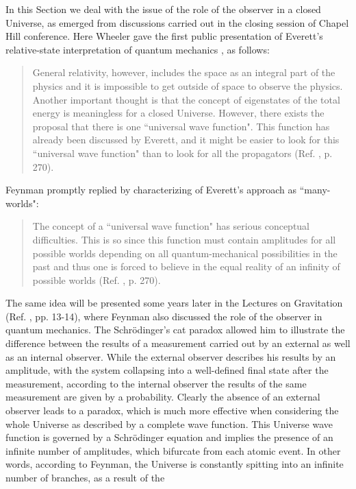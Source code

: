 \documentclass{ws-procs961x669}            %
\begin{document}
In this Section we deal with the issue of the role of the observer
in a closed Universe, as emerged from discussions carried out in
the closing session of Chapel Hill conference. Here Wheeler gave
the first public presentation of Everett's relative-state
interpretation of quantum mechanics \cite{Everett,Osnaghi}, as
follows:
%
\begin{quote}
General relativity, however, includes the space as an integral
part of the physics and it is impossible to get outside of space
to observe the physics. Another important thought is that the
concept of eigenstates of the total energy is meaningless for a
closed Universe. However, there exists the proposal that there is
one ``universal wave function". This function has already been
discussed by Everett, and it might be easier to look for this
``universal wave function" than to look for all the propagators
(Ref. , p. 270).
\end{quote}
%
Feynman promptly replied by characterizing of Everett's approach
as ``many-worlds":
%
\begin{quote}
The concept of a ``universal wave function" has serious conceptual
difficulties. This is so since this function must contain
amplitudes for all possible worlds depending on all
quantum-mechanical possibilities in the past and thus one is
forced to believe in the equal reality of an infinity of possible
worlds (Ref. , p. 270).
\end{quote}
%
The same idea will be presented some years later in the Lectures
on Gravitation (Ref. , pp. 13-14), where
Feynman also discussed the role of the observer in quantum
mechanics. The Schr\"{o}dinger's cat paradox allowed him to
illustrate the difference between the results of a measurement
carried out by an external as well as an internal observer. While
the external observer describes his results by an amplitude, with
the system collapsing into a well-defined final state after the
measurement, according to the internal observer the results of the
same measurement are given by a probability. Clearly the absence
of an external observer leads to a paradox, which is much more
effective when considering the whole Universe as described by a
complete wave function. This Universe wave function is governed by
a Schr\"{o}dinger equation and implies the presence of an infinite
number of amplitudes, which bifurcate from each atomic event. In
other words, according to Feynman, the Universe is constantly
spitting into an infinite number of branches, as a result of the
\end{document}
